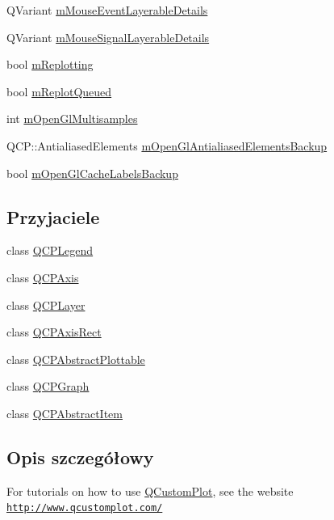\begin{DoxyCompactItemize}
\item 
Q\+Variant \hyperlink{class_q_custom_plot_ad604958ef16fc022c474521a08d88a2d}{m\+Mouse\+Event\+Layerable\+Details}
\item 
Q\+Variant \hyperlink{class_q_custom_plot_a2f313604bb22781633137915f3c100e6}{m\+Mouse\+Signal\+Layerable\+Details}
\item 
bool \hyperlink{class_q_custom_plot_ab30daeca6612c3948afd368dce5f1c39}{m\+Replotting}
\item 
bool \hyperlink{class_q_custom_plot_acedeef316dfcde835b8ea0112cec2a77}{m\+Replot\+Queued}
\item 
int \hyperlink{class_q_custom_plot_aacafac2b2280b6a868a4b734273a394c}{m\+Open\+Gl\+Multisamples}
\item 
Q\+C\+P\+::\+Antialiased\+Elements \hyperlink{class_q_custom_plot_adbf005715d5f8550511819a4baf841fb}{m\+Open\+Gl\+Antialiased\+Elements\+Backup}
\item 
bool \hyperlink{class_q_custom_plot_ab1692469dde841080fa33719533bf2b7}{m\+Open\+Gl\+Cache\+Labels\+Backup}
\end{DoxyCompactItemize}
\subsection*{Przyjaciele}
\begin{DoxyCompactItemize}
\item 
class \hyperlink{class_q_custom_plot_a8429035e7adfbd7f05805a6530ad5e3b}{Q\+C\+P\+Legend}
\item 
class \hyperlink{class_q_custom_plot_af123edeca169ec7a31958a1d714e1a8a}{Q\+C\+P\+Axis}
\item 
class \hyperlink{class_q_custom_plot_a5dbf96bf7664c1b6fce49063eeea6eef}{Q\+C\+P\+Layer}
\item 
class \hyperlink{class_q_custom_plot_acbf20ecb140f66c5fd1bc64ae0762990}{Q\+C\+P\+Axis\+Rect}
\item 
class \hyperlink{class_q_custom_plot_a53cf0e76aca814550c796fed79e345d6}{Q\+C\+P\+Abstract\+Plottable}
\item 
class \hyperlink{class_q_custom_plot_ad0c52e327d94c699d415fd61f930700a}{Q\+C\+P\+Graph}
\item 
class \hyperlink{class_q_custom_plot_a93e962f2e677e31ecc575bb884e46adf}{Q\+C\+P\+Abstract\+Item}
\end{DoxyCompactItemize}


\subsection{Opis szczegółowy}
For tutorials on how to use \hyperlink{class_q_custom_plot}{Q\+Custom\+Plot}, see the website~\newline
\href{http://www.qcustomplot.com/}{\tt http\+://www.\+qcustomplot.\+com/} 

